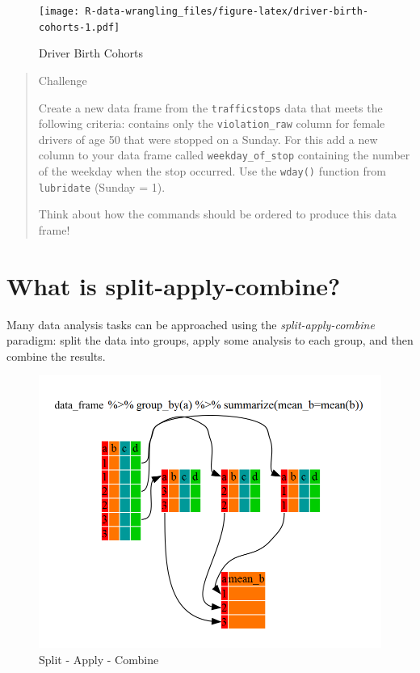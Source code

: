 \documentclass[]{book}
\begin{document}
\begin{figure}
\centering
\texttt{[image: R-data-wrangling\_files/figure-latex/driver-birth-cohorts-1.pdf]}
\caption{\label{fig:driver-birth-cohorts}Driver Birth Cohorts}
\end{figure}

\begin{quote}
Challenge

Create a new data frame from the \texttt{trafficstops} data that meets the following
criteria: contains only the \texttt{violation\_raw} column for female drivers of age 50 that were stopped on a Sunday. For this add a new column to your data frame called
\texttt{weekday\_of\_stop} containing the number of the weekday when the stop occurred. Use the \texttt{wday()} function from \texttt{lubridate} (Sunday = 1).

Think about how the commands should be ordered to produce this data frame!
\end{quote}

\hypertarget{what-is-split-apply-combine}{%
\section{What is split-apply-combine?}\label{what-is-split-apply-combine}}

Many data analysis tasks can be approached using the \emph{split-apply-combine}
paradigm: split the data into groups, apply some analysis to each group, and
then combine the results.

\begin{figure}
\includegraphics[width=\textwidth]{img/split-apply-combine} \caption{Split - Apply - Combine}\label{fig:split-apply-combine}
\end{figure}
\end{document}
